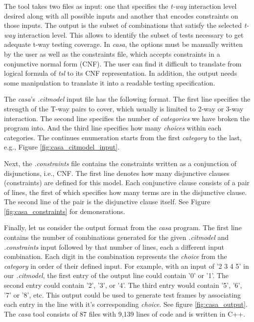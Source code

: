\documentclass[a4full,12pt]{article}
\begin{document}
  The tool takes two files as input: one that specifies the \emph{t-way} interaction
  level desired along with all possible inputs and another that encodes constraints on those
  inputs. The output is the subset of combinations that satisfy the selected \emph{t-way}
  interaction level. This allows to identify the subset of tests necessary to get adequate
  t-way testing coverage. In \emph{casa}, the options must be manually written by the user as well as the constraints
  file, which accepts constraints in a conjunctive normal form (CNF). The user can find it difficult to translate from logical formula of \emph{tsl} to its CNF representation. In addition, the output needs some manipulation to translate it into a readable testing specification.
  
The \emph{casa}'s \emph{.citmodel} input file has the following format. The first line
  specifies the strength of the T-way pairs to cover, which usually is limited to 2-way or 3-way interaction. The second line specifies the number
  of \emph{categories} we have broken the program into. And the third line specifies how
  many \emph{choices} within each categories. The continues enumeration starts from the first \emph{category} to
  the last, e.g.,  Figure \ref{fig:casa_citmodel_input}. 
  
  Next, the \emph{.constraints}
  file contains the constraints written as a conjunction of disjunctions, i.e., CNF. The first line
denotes how many disjunctive clauses (constraints) are defined for this model. Each
  conjunctive clause consists of a pair of lines, the first of which specifies how many terms
are in the disjunctive clause. The second line of the pair is the disjunctive clause itself. See Figure \ref{fig:casa_constraints} for demonsrations.

Finally, let us consider the output format from the \emph{casa} program. The first line contains
  the number of combinations generated for the given \emph{.citmodel} and \emph{.constraints}
  input followed by that number of lines, each a different input combination. Each digit in
  the combination represents the \emph{choice} from the \emph{category} in order of their
  defined input. For example, with an input of '2 3 4 5' in our \emph{.citmodel}, the first
  entry of the output line could contain '0' or '1'. The second entry could contain '2', '3',
  or '4'. The third entry would contain '5', '6', '7' or '8', etc. This output could be used
  to generate test frames by associating each entry in the line with it's corresponding
  \emph{choice}. See figure \ref{fig:casa_output}. The \emph{casa} tool consists of 87 files
  with 9,139 lines of code and is written in C++.
  
\end{document}
